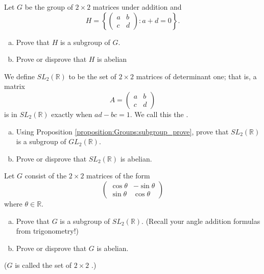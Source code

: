 \begin{exercise}{}
Let $G$ be the group of $2 \times 2$ matrices under addition and
\[
H
=
\left\{
\begin{pmatrix}
a & b \\
c & d
\end{pmatrix}
:
a + d = 0
\right\}.
\]
\begin{enumerate}[(a)]
\item
Prove that $H$ is a subgroup of $G$.
\item
Prove or disprove that $H$ is abelian
\end{enumerate}
\end{exercise}


\begin{exercise}{70}
We define $SL_2( {\mathbb R})$\label{speciallinear} to be the set of $2 \times 2$ matrices of determinant one; that is, a matrix
\[
A =
\begin{pmatrix}
a & b \\
c & d
\end{pmatrix}
\]
is in $SL_2( {\mathbb R})$ exactly when $ad - bc = 1$.  We call this the  \label{speciallinear}.

\begin{enumerate}[(a)]
\item
Using Proposition \ref{proposition:Groups:subgroup_prove}, prove that $SL_2( {\mathbb R})$ is a subgroup of $GL_2( {\mathbb R})$.
\item
Prove or disprove that $SL_2( {\mathbb R})$ is abelian.
\end{enumerate}
\end{exercise}

\begin{exercise}{}
Let $G$ consist of the $2 \times 2$ matrices of the form
\[
\begin{pmatrix}
\cos \theta & -\sin \theta \\
\sin \theta & \cos \theta
\end{pmatrix}
\]
where $\theta \in {\mathbb R}$. 
\begin{enumerate}[(a)]
\item
Prove that $G$ is a subgroup of $SL_2(
{\mathbb R})$.  (Recall your angle addition formulas from trigonometry!)

\item
Prove or disprove that $G$ is abelian.  
\end{enumerate} 
($G$ is called the set of $2 \times 2$ .)
\end{exercise} 
 

